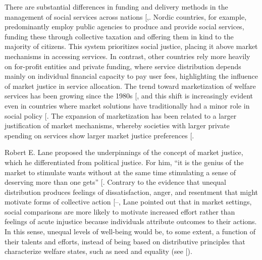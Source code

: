 \documentclass[
  12pt,
  letterpaper,
]{article}
\begin{document}
There are substantial differences in funding and delivery methods in the
management of social services across nations
{[},\citeproc{ref-stoy_worlds_2014}{34}{]}.
Nordic countries, for example, predominantly employ public agencies to
produce and provide social services, funding these through collective
taxation and offering them in kind to the majority of citizens. This
system prioritizes social justice, placing it above market mechanisms in
accessing services. In contrast, other countries rely more heavily on
for-profit entities and private funding, where service distribution
depends mainly on individual financial capacity to pay user fees,
highlighting the influence of market justice in service allocation. The
trend toward marketization of welfare services has been growing since
the 1980s {[}\citeproc{ref-salamon_marketization_1993}{35}{]}, and this
shift is increasingly evident even in countries where market solutions
have traditionally had a minor role in social policy
{[}\citeproc{ref-sivesind_changing_2017}{36}{]}. The expansion of
marketization has been related to a larger justification of market
mechanisms, whereby societies with larger private spending on services
show larger market justice preferences
{[}\citeproc{ref-lindh_public_2015}{11}{]}.

Robert E. Lane proposed the underpinnings of the concept of market
justice, which he differentiated from political justice. For him, ``it
is the genius of the market to stimulate wants without at the same time
stimulating a sense of deserving more than one gets''
{[}\citeproc{ref-lane_market_1986}{9}{]}. Contrary to the evidence that
unequal distribution produces feelings of dissatisfaction, anger, and
resentment that might motivate forms of collective action
{[}--\citeproc{ref-power_deprivationprotest_2018}{40}{]},
Lane pointed out that in market settings, social comparisons are more
likely to motivate increased effort rather than feelings of acute
injustice because individuals attribute outcomes to their actions. In
this sense, unequal levels of well-being would be, to some extent, a
function of their talents and efforts, instead of being based on
distributive principles that characterize welfare states, such as need
and equality (see {[}\citeproc{ref-wilson_role_2003}{41}{]}).
\end{document}
